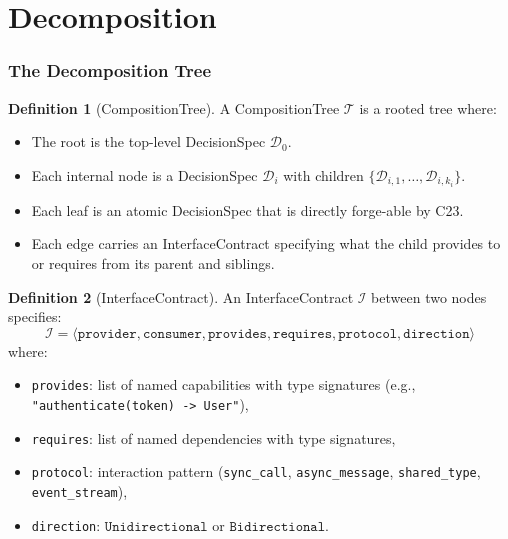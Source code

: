 \documentclass[11pt,a4paper,twoside]{article}
\theoremstyle{definition}
\newtheorem{definition}{Definition}[section]
\theoremstyle{plain}
\theoremstyle{remark}
\newcommand{\calD}{\mathcal{D}}
\newcommand{\calT}{\mathcal{T}}
\newcommand{\calI}{\mathcal{I}}
\begin{document}
\part{Decomposition}\label{part:decomp}

\section{The Decomposition Tree}\label{sec:decomptree}

\begin{definition}[CompositionTree]\label{def:comptree}
A CompositionTree $\calT$ is a rooted tree where:
\begin{itemize}[nosep]
  \item The root is the top-level DecisionSpec $\calD_0$.
  \item Each internal node is a DecisionSpec $\calD_i$ with children
        $\{\calD_{i,1}, \ldots, \calD_{i,k_i}\}$.
  \item Each leaf is an atomic DecisionSpec that is directly
        forge-able by C23.
  \item Each edge carries an InterfaceContract specifying what the
        child provides to or requires from its parent and siblings.
\end{itemize}
\end{definition}

\begin{definition}[InterfaceContract]\label{def:contract}
An InterfaceContract $\calI$ between two nodes specifies:
\[
  \calI = \langle \mathtt{provider}, \mathtt{consumer},
          \mathtt{provides}, \mathtt{requires},
          \mathtt{protocol}, \mathtt{direction} \rangle
\]
where:
\begin{itemize}[nosep]
  \item \texttt{provides}: list of named capabilities with type
        signatures (e.g., \texttt{"authenticate(token) -> User"}),
  \item \texttt{requires}: list of named dependencies with type
        signatures,
  \item \texttt{protocol}: interaction pattern
        (\texttt{sync\_call}, \texttt{async\_message},
        \texttt{shared\_type}, \texttt{event\_stream}),
  \item \texttt{direction}: $\texttt{Unidirectional}$ or
        $\texttt{Bidirectional}$.
\end{itemize}
\end{definition}
\end{document}

